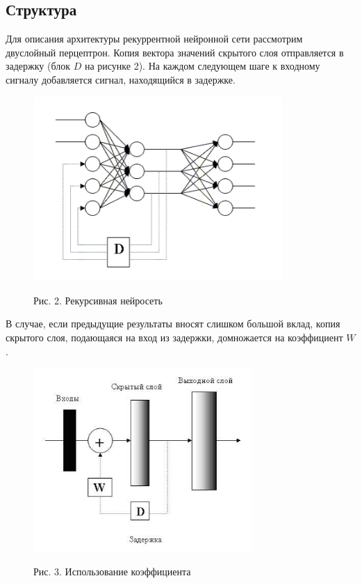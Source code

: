 \documentclass[14pt]{article}
\begin{document}
\subsection{Структура}
Для описания архитектуры рекуррентной нейронной сети рассмотрим двуслойный перцептрон. Копия вектора значений скрытого слоя отправляется в задержку (блок $D$ на рисунке 2). На каждом следующем шаге к входному сигналу добавляется сигнал, находящийся в задержке.

\begin{figure}[!h]
    \centering
        \includegraphics[height=7cm]{Fig2.png}
    \parbox[t][1.2cm][c]{16cm}{
        \centering
        Рис. 2. Рекурсивная нейросеть
    }
\end{figure}


В случае, если предыдущие результаты вносят слишком большой вклад, копия скрытого слоя, подающаяся на вход из задержки, домножается на коэффициент $W$.


\begin{figure}[!h]
    \centering
        \includegraphics[height=7cm]{Fig4.jpg}
    \parbox[t][1.2cm][c]{16cm}{
        \centering
        Рис. 3. Использование коэффициента
    }
\end{figure}
\end{document}
